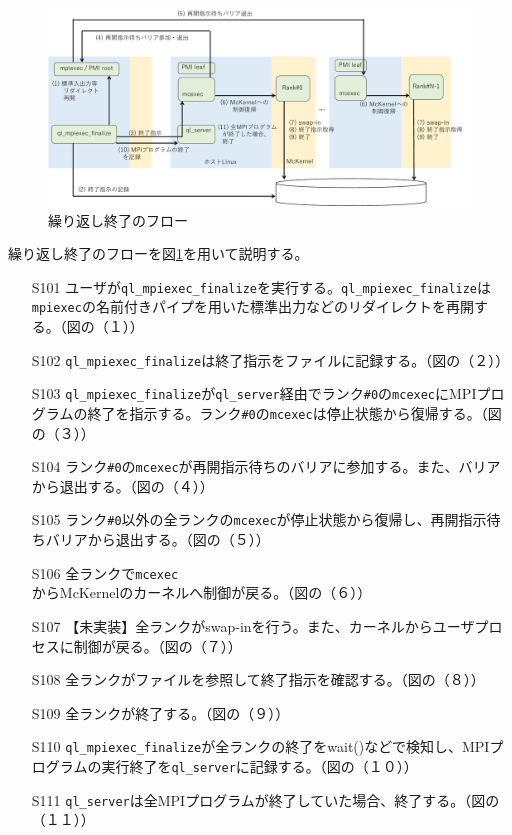 \documentclass[twoside,11pt,fleqn]{book}
\begin{document}
{\begin{figure}[!t]
\centering
\includegraphics[width=0.95\linewidth]{figs/qlflowfin.pdf}
\vspace{-0em}\caption{繰り返し終了のフロー}
\label{fig:qlflowfin}
\vspace{-0em}
\end{figure}
\FloatBarrier
%
繰り返し終了のフローを図\ref{fig:qlflowfin}を用いて説明する。
\begin{itemize}
\item[S101] ユーザが\texttt{ql\_mpiexec\_finalize}を実行する。\texttt{ql\_mpiexec\_finalize}は\texttt{mpiexec}の名前付きパイプを用いた標準出力などのリダイレクトを再開する。（図の（１））
\item[S102] \texttt{ql\_mpiexec\_finalize}は終了指示をファイルに記録する。（図の（２））
\item[S103] \texttt{ql\_mpiexec\_finalize}が\texttt{ql\_server}経由でランク\texttt{\#0}の\texttt{mcexec}にMPIプログラムの終了を指示する。ランク\texttt{\#0}の\texttt{mcexec}は停止状態から復帰する。（図の（３））
\item[S104] ランク\texttt{\#0}の\texttt{mcexec}が再開指示待ちのバリアに参加する。また、バリアから退出する。（図の（４））
\item[S105] ランク\texttt{\#0}以外の全ランクの\texttt{mcexec}が停止状態から復帰し、再開指示待ちバリアから退出する。（図の（５））
\item[S106] 全ランクで\texttt{mcexec}からMcKernelのカーネルへ制御が戻る。（図の（６））
\item[S107] 【未実装】全ランクがswap-inを行う。また、カーネルからユーザプロセスに制御が戻る。（図の（７））
\item[S108] 全ランクがファイルを参照して終了指示を確認する。（図の（８））
\item[S109] 全ランクが終了する。（図の（９））
\item[S110] \texttt{ql\_mpiexec\_finalize}が全ランクの終了をwait()などで検知し、MPIプログラムの実行終了を\texttt{ql\_server}に記録する。（図の（１０））
\item[S111] \texttt{ql\_server}は全MPIプログラムが終了していた場合、終了する。（図の（１１））
\end{itemize}
\FloatBarrier
}
\end{document}
